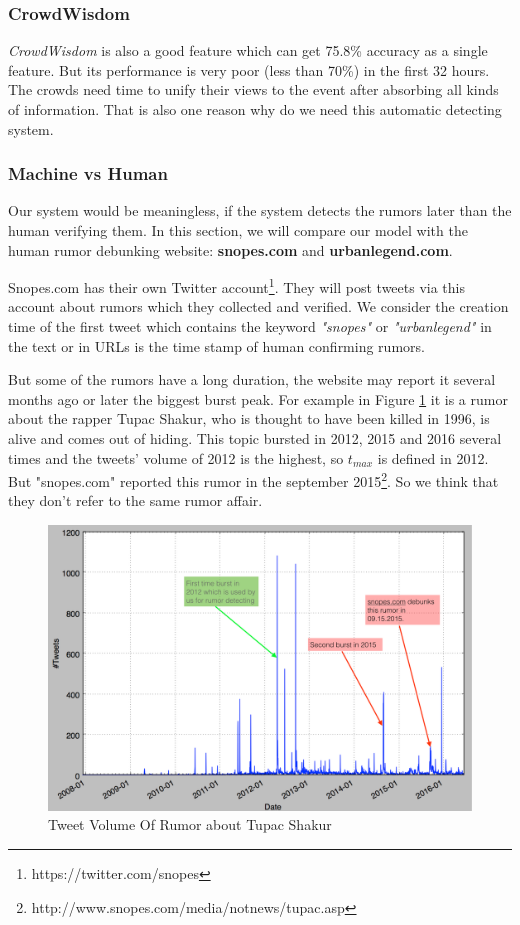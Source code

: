  \subsubsection{CrowdWisdom} 
\emph{CrowdWisdom} is also a good feature which can get 75.8\% accuracy as a single feature. But its performance is very poor (less than 70\%) in the first 32 hours. The crowds need time to unify their views to the event after absorbing all kinds of information. That is also one reason why do we need this automatic detecting system. 

 \subsubsection{Machine vs Human} 
 Our system would be meaningless, if the system detects the rumors later than the human verifying them. In this section, we will compare our model with the human rumor debunking website: \textbf{snopes.com} and  \textbf{urbanlegend.com}. 
 
 Snopes.com has their own Twitter account\footnote{https://twitter.com/snopes}. They will post tweets via this account about rumors which they collected and verified. We consider the creation time of the first tweet which contains the keyword \emph{"snopes"} or \emph{"urbanlegend"} in the text or in URLs is the time stamp of human confirming rumors. 


But some of the rumors have a long duration, the website may report it several months ago or later the biggest burst peak. For example in Figure \ref{fig:Multipike} it is a rumor about the rapper Tupac Shakur, who is thought to have been killed in 1996, is alive and comes out of hiding. This topic bursted in 2012, 2015 and 2016 several times and the tweets' volume of 2012 is the highest, so $t_{max}$ is defined in 2012. But "snopes.com" reported this rumor in the september 2015\footnote{http://www.snopes.com/media/notnews/tupac.asp}. So we think that they don't refer to the same rumor affair.
  \begin{figure}[!h]
\centering
\includegraphics[width=0.8\columnwidth]{images/mutipikehiding.png}
\caption{Tweet Volume Of Rumor about Tupac Shakur}
\label{fig:Multipike}
\end{figure}   
   
